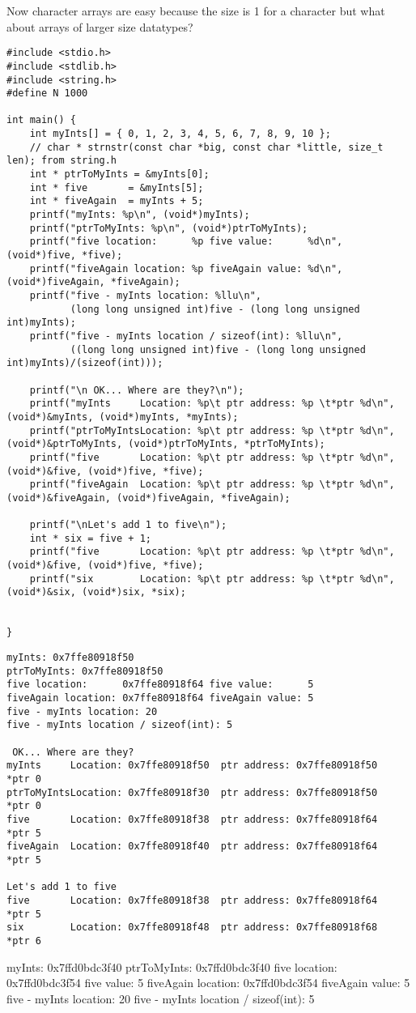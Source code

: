 \documentclass[11pt]{article}
\begin{document}
Now character arrays are easy because the size is 1 for a character
but what about arrays of larger size datatypes?

\begin{verbatim}
#include <stdio.h>
#include <stdlib.h>
#include <string.h>
#define N 1000

int main() {
    int myInts[] = { 0, 1, 2, 3, 4, 5, 6, 7, 8, 9, 10 };
    // char * strnstr(const char *big, const char *little, size_t len); from string.h
    int * ptrToMyInts = &myInts[0];
    int * five       = &myInts[5];
    int * fiveAgain  = myInts + 5;
    printf("myInts: %p\n", (void*)myInts);
    printf("ptrToMyInts: %p\n", (void*)ptrToMyInts);
    printf("five location:      %p five value:      %d\n", (void*)five, *five);
    printf("fiveAgain location: %p fiveAgain value: %d\n", (void*)fiveAgain, *fiveAgain);
    printf("five - myInts location: %llu\n", 
           (long long unsigned int)five - (long long unsigned int)myInts);
    printf("five - myInts location / sizeof(int): %llu\n", 
           ((long long unsigned int)five - (long long unsigned int)myInts)/(sizeof(int)));

    printf("\n OK... Where are they?\n");
    printf("myInts     Location: %p\t ptr address: %p \t*ptr %d\n", (void*)&myInts, (void*)myInts, *myInts);
    printf("ptrToMyIntsLocation: %p\t ptr address: %p \t*ptr %d\n", (void*)&ptrToMyInts, (void*)ptrToMyInts, *ptrToMyInts);
    printf("five       Location: %p\t ptr address: %p \t*ptr %d\n", (void*)&five, (void*)five, *five);
    printf("fiveAgain  Location: %p\t ptr address: %p \t*ptr %d\n", (void*)&fiveAgain, (void*)fiveAgain, *fiveAgain);

    printf("\nLet's add 1 to five\n");
    int * six = five + 1;
    printf("five       Location: %p\t ptr address: %p \t*ptr %d\n", (void*)&five, (void*)five, *five);
    printf("six        Location: %p\t ptr address: %p \t*ptr %d\n", (void*)&six, (void*)six, *six);


}
\end{verbatim}

\begin{verbatim}
myInts: 0x7ffe80918f50
ptrToMyInts: 0x7ffe80918f50
five location:      0x7ffe80918f64 five value:      5
fiveAgain location: 0x7ffe80918f64 fiveAgain value: 5
five - myInts location: 20
five - myInts location / sizeof(int): 5

 OK... Where are they?
myInts     Location: 0x7ffe80918f50	 ptr address: 0x7ffe80918f50 	*ptr 0
ptrToMyIntsLocation: 0x7ffe80918f30	 ptr address: 0x7ffe80918f50 	*ptr 0
five       Location: 0x7ffe80918f38	 ptr address: 0x7ffe80918f64 	*ptr 5
fiveAgain  Location: 0x7ffe80918f40	 ptr address: 0x7ffe80918f64 	*ptr 5

Let's add 1 to five
five       Location: 0x7ffe80918f38	 ptr address: 0x7ffe80918f64 	*ptr 5
six        Location: 0x7ffe80918f48	 ptr address: 0x7ffe80918f68 	*ptr 6
\end{verbatim}
myInts: 0x7ffd0bdc3f40
ptrToMyInts: 0x7ffd0bdc3f40
five location:      0x7ffd0bdc3f54 five value:      5
fiveAgain location: 0x7ffd0bdc3f54 fiveAgain value: 5
five - myInts location: 20
five - myInts location / sizeof(int): 5
\end{document}
